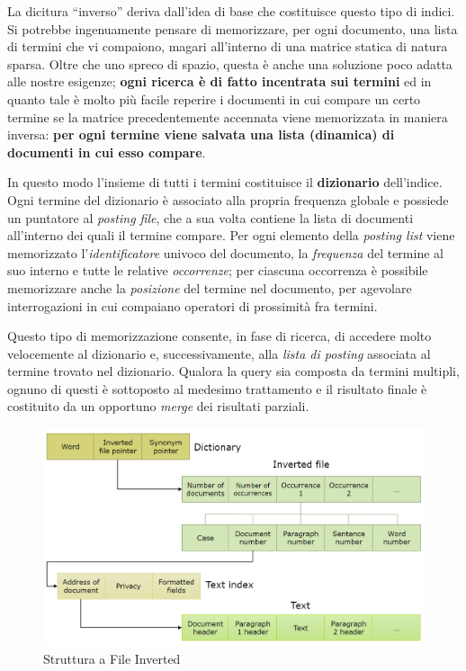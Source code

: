 La dicitura “inverso” deriva dall’idea di base che costituisce questo tipo di indici. Si potrebbe ingenuamente pensare di memorizzare, per ogni documento, una lista di termini che vi compaiono, magari all’interno di una matrice statica di natura sparsa. Oltre che uno spreco di spazio, questa è anche una soluzione poco adatta alle nostre esigenze; \textbf{ogni ricerca è di fatto incentrata sui termini} ed in quanto tale è molto più facile reperire i documenti in cui compare un certo termine se la matrice precedentemente accennata viene memorizzata in maniera inversa: \textbf{per ogni termine viene salvata una lista (dinamica) di documenti in cui esso compare}.

In questo modo l’insieme di tutti i termini costituisce il \textbf{dizionario} dell’indice. Ogni termine del dizionario è associato alla propria frequenza globale e possiede un puntatore al \textit{posting file}, che a sua volta contiene la lista di documenti all’interno dei quali il termine compare. Per ogni elemento della \textit{posting list} viene memorizzato l’\textit{identificatore} univoco del documento, la \textit{frequenza} del termine al suo interno e tutte le relative \textit{occorrenze}; per ciascuna occorrenza è possibile memorizzare anche la \textit{posizione} del termine nel documento, per agevolare interrogazioni in cui compaiano operatori di prossimità fra termini.

\vspace{1em}
Questo tipo di memorizzazione consente, in fase di ricerca, di accedere molto velocemente al dizionario e, successivamente, alla \textit{lista di posting} associata al termine trovato nel dizionario. Qualora la query sia composta da termini multipli, ognuno di questi è sottoposto al medesimo trattamento e il risultato finale è costituito da un opportuno \textit{merge} dei risultati parziali.

\begin{figure}[H]
	\centering
	\includegraphics[scale=0.46]{../images/01_3_indice_inverso}
	\caption[Struttura a File Inverted]{Struttura a File Inverted}
	\label{fig:invertedfile}
\end{figure}




